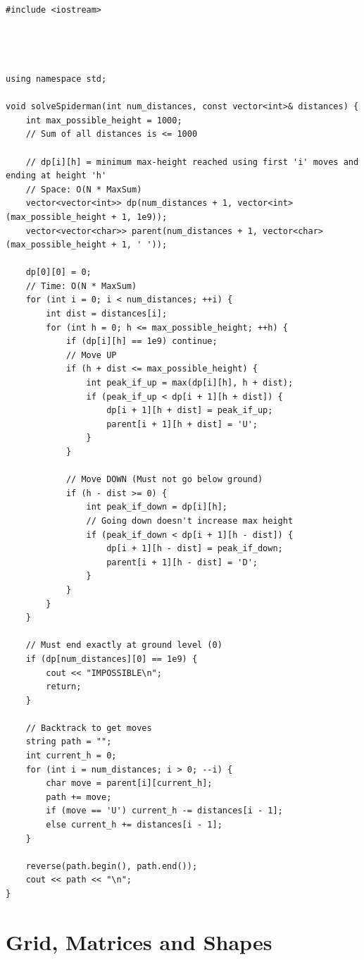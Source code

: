 \begin{lstlisting}
#include <iostream>




using namespace std;

void solveSpiderman(int num_distances, const vector<int>& distances) {
    int max_possible_height = 1000;
    // Sum of all distances is <= 1000
    
    // dp[i][h] = minimum max-height reached using first 'i' moves and ending at height 'h'
    // Space: O(N * MaxSum)
    vector<vector<int>> dp(num_distances + 1, vector<int>(max_possible_height + 1, 1e9));
    vector<vector<char>> parent(num_distances + 1, vector<char>(max_possible_height + 1, ' '));
    
    dp[0][0] = 0;
    // Time: O(N * MaxSum)
    for (int i = 0; i < num_distances; ++i) {
        int dist = distances[i];
        for (int h = 0; h <= max_possible_height; ++h) {
            if (dp[i][h] == 1e9) continue;
            // Move UP
            if (h + dist <= max_possible_height) {
                int peak_if_up = max(dp[i][h], h + dist);
                if (peak_if_up < dp[i + 1][h + dist]) {
                    dp[i + 1][h + dist] = peak_if_up;
                    parent[i + 1][h + dist] = 'U';
                }
            }
            
            // Move DOWN (Must not go below ground)
            if (h - dist >= 0) {
                int peak_if_down = dp[i][h];
                // Going down doesn't increase max height
                if (peak_if_down < dp[i + 1][h - dist]) {
                    dp[i + 1][h - dist] = peak_if_down;
                    parent[i + 1][h - dist] = 'D';
                }
            }
        }
    }
    
    // Must end exactly at ground level (0)
    if (dp[num_distances][0] == 1e9) {
        cout << "IMPOSSIBLE\n";
        return;
    }
    
    // Backtrack to get moves
    string path = "";
    int current_h = 0;
    for (int i = num_distances; i > 0; --i) {
        char move = parent[i][current_h];
        path += move;
        if (move == 'U') current_h -= distances[i - 1];
        else current_h += distances[i - 1];
    }
    
    reverse(path.begin(), path.end());
    cout << path << "\n";
}
\end{lstlisting}


\section{Grid, Matrices and Shapes}
